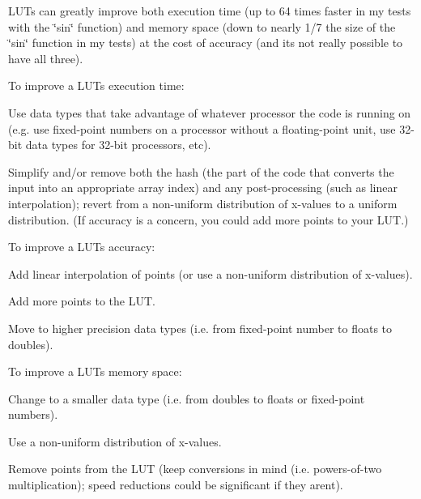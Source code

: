 \begin{DoxyItemize}
\item L\+U\+Ts can greatly improve both execution time (up to 64 times faster in my tests with the \char`\"{}sin\char`\"{} function) and memory space (down to nearly 1/7 the size of the \char`\"{}sin\char`\"{} function in my tests) at the cost of accuracy (and it\textquotesingle{}s not really possible to have all three).
\item To improve a L\+UT\textquotesingle{}s execution time\+:
\begin{DoxyItemize}
\item Use data types that take advantage of whatever processor the code is running on (e.\+g. use fixed-\/point numbers on a processor without a floating-\/point unit, use 32-\/bit data types for 32-\/bit processors, etc).
\item Simplify and/or remove both the hash (the part of the code that converts the input into an appropriate array index) and any post-\/processing (such as linear interpolation); revert from a non-\/uniform distribution of x-\/values to a uniform distribution. (If accuracy is a concern, you could add more points to your L\+UT.)
\end{DoxyItemize}
\item To improve a L\+UT\textquotesingle{}s accuracy\+:
\begin{DoxyItemize}
\item Add linear interpolation of points (or use a non-\/uniform distribution of x-\/values).
\item Add more points to the L\+UT.
\item Move to higher precision data types (i.\+e. from fixed-\/point number to floats to doubles).
\end{DoxyItemize}
\item To improve a L\+UT\textquotesingle{}s memory space\+:
\begin{DoxyItemize}
\item Change to a smaller data type (i.\+e. from doubles to floats or fixed-\/point numbers).
\item Use a non-\/uniform distribution of x-\/values.
\item Remove points from the L\+UT (keep conversions in mind (i.\+e. powers-\/of-\/two multiplication); speed reductions could be significant if they aren\textquotesingle{}t).
\end{DoxyItemize}
\end{DoxyItemize}

